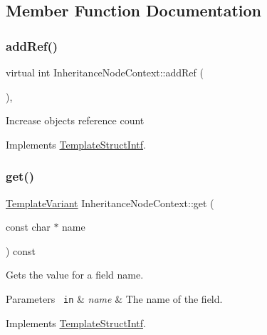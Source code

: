 \subsection{Member Function Documentation}
\mbox{\label{class_inheritance_node_context_a5184d5ea8a197cb2de5cf66b3c0a9e88}} 
\subsubsection{\texorpdfstring{addRef()}{addRef()}}
{\footnotesize\ttfamily virtual int Inheritance\+Node\+Context\+::add\+Ref (\begin{DoxyParamCaption}{ }\end{DoxyParamCaption})\hspace{0.3cm}{\ttfamily [inline]}, {\ttfamily [virtual]}}

Increase object\textquotesingle{}s reference count 

Implements \mbox{\hyperlink{class_template_struct_intf_a05fe97ad47633beb326f69686faed581}{Template\+Struct\+Intf}}.

\mbox{\label{class_inheritance_node_context_a59624a043dc6d4af026dbe77963a2284}} 
\subsubsection{\texorpdfstring{get()}{get()}}
{\footnotesize\ttfamily \mbox{\hyperlink{class_template_variant}{Template\+Variant}} Inheritance\+Node\+Context\+::get (\begin{DoxyParamCaption}\item[{const char $\ast$}]{name }\end{DoxyParamCaption}) const\hspace{0.3cm}{\ttfamily [virtual]}}

Gets the value for a field name. 
\begin{DoxyParams}[1]{Parameters}
\mbox{\texttt{ in}}  & {\em name} & The name of the field. \\
\hline
\end{DoxyParams}


Implements \mbox{\hyperlink{class_template_struct_intf_a3d610cb81b4adbb531ebed3aa3d09b51}{Template\+Struct\+Intf}}.

